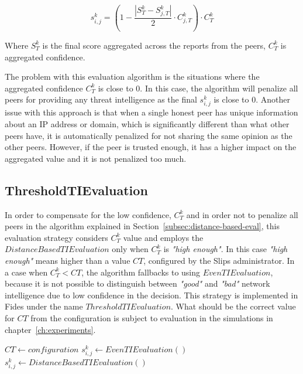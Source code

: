 \begin{equation}
s^{k}_{i, j} = \left(1 - \frac{|{S}^{k}_{T} - S^{k}_{j, T}|}{2} \cdot C^{k}_{j, T}\right) \cdot C^{k}_{T}
\end{equation}

Where $S^{k}_{T}$ is the final score aggregated across the reports from the peers, $C^{k}_{T}$ is aggregated confidence.

The problem with this evaluation algorithm is the situations where the aggregated confidence $C^{k}_{T}$ is close to $0$. In this case, the algorithm will penalize all peers for providing any threat intelligence as the final $s^{k}_{i, j}$ is close to $0$. Another issue with this approach is that when a single honest peer has unique information about an IP address or domain, which is significantly different than what other peers have, it is automatically penalized for not sharing the same opinion as the other peers. However, if the peer is trusted enough, it has a higher impact on the aggregated value and it is not penalized too much.

\subsection{ThresholdTIEvaluation}
\label{subsec:network-intelligence-conf-high-enough}
In order to compensate for the low confidence, $C^{k}_{T}$ and in order not to penalize all peers in the algorithm explained in Section~\ref{subsec:distance-based-eval}, this evaluation strategy considers $C^{k}_{T}$ value and employs the $DistanceBasedTIEvaluation$ only when $C^{k}_{T}$ is \textit{"high enough"}. In this case \textit{"high enough"} means higher than a value ${CT}$, configured by the Slips administrator.
In a case when  $C^{k}_{T} < {CT}$, the algorithm fallbacks to using $EvenTIEvaluation$, because it is not possible to distinguish between \textit{"good"} and \textit{"bad"} network intelligence due to low confidence in the decision. 
This strategy is implemented in Fides under the name $ThresholdTIEvaluation$.
What should be the correct value for $CT$ from the configuration is subject to evaluation in the simulations in chapter~\ref{ch:experiments}.

\begin{algorithm}
\caption{$ThresholdTIEvaluation$}\label{alg:threshold-ti-evaluation}
\begin{algorithmic}[1]
\State ${CT} \gets configuration$ 
	\State $s^{k}_{i, j} \gets EvenTIEvaluation()$
\Else
    \State $s^{k}_{i, j} \gets DistanceBasedTIEvaluation()$
\EndIf
\end{algorithmic}
\end{algorithm}

